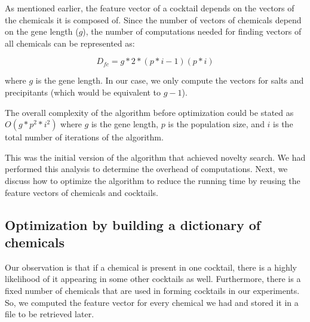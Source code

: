 

As mentioned earlier, the feature vector of a cocktail depends on the vectors of the chemicals it is composed of. 
Since the number of vectors of chemicals depend on the gene length ($g$), the number of computations needed for finding vectors of all chemicals can be represented as:

\begin{equation}
D_{fc} = g * 2* (p*i - 1)(p*i) \label{eq}
\end{equation}

\noindent
where $g$ is the gene length. In our case, we only compute the vectors for salts and precipitants (which would be equivalent to $g-1$).

The overall complexity of the algorithm before optimization could be stated as $O ( g * p^2 * i^2 )$
where $g$ is the gene length, $p$ is the population size, and $i$ is the total number of iterations of the algorithm.

This was the initial version of the algorithm that achieved novelty search. We had performed this analysis to determine the overhead of computations. Next, we discuss how to optimize the algorithm to reduce  
the running time by reusing the feature vectors of chemicals and cocktails. 


\subsection{Optimization by building a dictionary of chemicals}\label{sec:GA-runtime-reappear-chemicals}

Our observation is that if a chemical is present in one cocktail, there is a highly likelihood of it appearing in some other cocktails as well. Furthermore, there is a fixed number of chemicals that are used in forming cocktails in our experiments. So, we computed the feature vector for every chemical we had and stored it in a file to be retrieved later.

